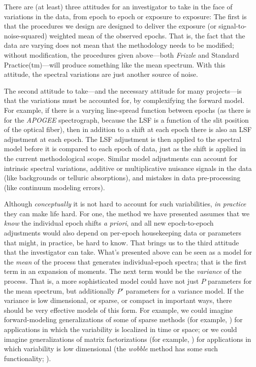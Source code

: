 \documentclass[modern, linenumbers]{aastex631}
\newcommand{\name}{\textsl{Frizzle}}
\begin{document}
There are (at least) three attitudes for an investigator to take in the face of variations in the data, from epoch to epoch or exposure to exposure:
The first is that the procedures we design are designed to deliver the exposure (or signal-to-noise-squared) weighted mean of the observed epochs.
That is, the fact that the data are varying does not mean that the methodology needs to be modified; without modification, the procedures given above---both \name{} and Standard Practice(tm)---will produce something like the mean spectrum.
With this attitude, the spectral variations are just another source of noise.

The second attitude to take---and the necessary attitude for many projects---is that the variations must be accounted for, by complexifying the forward model.
For example, if there is a varying line-spread function between epochs (as there is for the \textsl{APOGEE} spectrograph, because the LSF is a function of the slit position of the optical fiber), then in addition to a shift at each epoch there is also an LSF adjustment at each epoch.
The LSF adjustment is then applied to the spectral model before it is compared to each epoch of data, just as the shift is applied in the current methodological scope.
Similar model adjustments can account for intrinsic spectral variations, additive or multiplicative nuisance signals in the data (like backgrounds or telluric absorptions), and mistakes in data pre-processing (like continuum modeling errors).

Although \emph{conceptually} it is not hard to account for such variabilities, \emph{in practice} they can make life hard.
For one, the method we have presented assumes that we \emph{know} the individual epoch shifts \textsl{a priori}, and all new epoch-to-epoch adjustments would also depend on per-epoch housekeeping data or parameters that might, in practice, be hard to know.
That brings us to the third attitude that the investigator can take.
What's presented above can be seen as a model for the \emph{mean} of the process that generates individual-epoch spectra; that is the first term in an expansion of moments.
The next term would be the \emph{variance} of the process.
That is, a more sophisticated model could have not just $P$ parameters for the mean spectrum, but additionally $P'$ parameters for a variance model.
If the variance is low dimensional, or sparse, or compact in important ways, there should be very effective models of this form.
For example, we could imagine forward-modeling generalizations of some of sparse methods (for example, \citealt{candes}) for applications in which the variability is localized in time or space; or we could imagine generalizations of matrix factorizations (for example, \citealt{hmf}) for applications in which variability is low dimensional (the \textsl{wobble} method has some such functionality; \citealt{wobble}).
\end{document}
